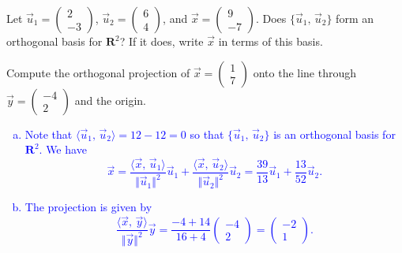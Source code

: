 \documentclass[a4paper,11pt]{article}
\newcommand{\R}{\mathbf{R}}
\newcommand{\blue}[1]{\textcolor{blue}{#1}}
\begin{document}
\begin{enumerate*}[(a)]
\item Let $\vec u_1=\left( \begin{smallmatrix}2\\-3\end{smallmatrix} \right)$,
  $\vec u_2=\left( \begin{smallmatrix}6\\4\end{smallmatrix} \right)$, and $\vec
  x=\left( \begin{smallmatrix}9\\-7\end{smallmatrix} \right)$. Does $\{\vec
  u_1,\,\vec u_2\}$ form an orthogonal basis for $\R^2$? If it does, write $\vec
  x$ in terms of this basis.
\item Compute the orthogonal projection of
  $\vec x=\left( \begin{smallmatrix}1\\7\end{smallmatrix} \right)$ onto the line
  through $\vec y = \left( \begin{smallmatrix}-4\\2\end{smallmatrix} \right)$
  and the origin. \\
\end{enumerate*}

\blue{
  \begin{enumerate}[(a)]
  \item Note that $\langle \vec u_1,\,\vec u_2 \rangle = 12-12 = 0$ so that
    $\{\vec u_1,\,\vec u_2\}$ is an orthogonal basis for $\R^2$. We have
    \[
      \vec x = \frac{\langle \vec x,\,\vec u_1 \rangle}{\Vert \vec u_1
        \Vert^2}\vec u_1 + \frac{\langle \vec x,\,\vec u_2 \rangle}{\Vert \vec u_2
        \Vert^2}\vec u_2 = \frac{39}{13}\vec u_1 + \frac{13}{52}\vec
      u_2.
    \]
  \item The projection is given by
    \[
      \frac{\langle \vec x,\,\vec y \rangle}{\Vert \vec y \Vert^2}\vec y
      = \frac{-4+14}{16+4}
      \left(
        \begin{array}{r}
          -4\\2
        \end{array}
      \right)
      =
      \left(
        \begin{array}{r}
          -2\\1
        \end{array}
      \right).
    \] \\
  \end{enumerate}
}
\end{document}
